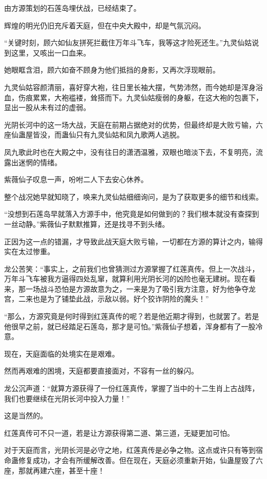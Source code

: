 
\begin{this_body}

由方源策划的石莲岛埋伏战，已经结束了。

辉煌的明光仍旧充斥着天庭，但在中央大殿中，却是气氛沉闷。

“关键时刻，顾六如仙友拼死拦截住万年斗飞车，我等这才险死还生。”九灵仙姑说到这里，又咳出一口血来。

她眼眶含泪，顾六如奋不顾身为他们抵挡的身影，又再次浮现眼前。

九灵仙姑容颜清丽，喜好穿大袍，往日里长袖大摆，气势沛然，而今她却是浑身浴血，伤痕累累，大袍褴褛，耸搭而下。九灵仙姑瘦弱的身躯，在这大袍的包裹下，显出一股从未有过的虚弱。

光阴长河中的这一场大战，天庭在前期占据绝对的优势，但最终却是大败亏输，六座仙蛊屋皆没，而蛊仙只有九灵仙姑和凤九歌两人逃脱。

凤九歌此时也在大殿之中，没有往日的潇洒温雅，双眼也暗淡下去，不复明亮，流露出迷惘的情绪。

紫薇仙子叹息一声，吩咐二人下去安心休养。

整个战况她早就知晓了，唤来九灵仙姑细细询问，是为了获取更多的细节和线索。

“没想到石莲岛早就落入方源手中，他究竟是如何做到的？我们根本就没有查探到一丝动静。”紫薇仙子默默推算，还是找寻不到头绪。

正因为这一点的错漏，才导致此战天庭大败亏输，一切都在方源的算计之内，输得实在太过惨重。

龙公苦笑：“事实上，之前我们也曾猜测过方源掌握了红莲真传。但上一次战斗，万年斗飞车被我方逼得四处乱窜，就算利用光阴长河的凶险也毫无建树。现在看来，那一场战斗恐怕是方源故意为之，一来是为了吸引我方注意，好为他争夺龙宫，二来也是为了铺垫此战，示敌以弱。好个狡诈阴险的魔头！”

“那么，方源究竟是何时得到红莲真传的呢？若是他近期才得到，也就罢了。若是他很早之前，就已经踏足石莲岛，那才是可怕。”紫薇仙子想着，浑身都有了一股冷意。

现在，天庭面临的处境实在是艰难。

然而再艰难的困境，天庭都要直接面对，不容有一丝的躲闪。

龙公沉声道：“就算方源获得了一份红莲真传，掌握了当中的十二生肖上古战阵，我们也要继续在光阴长河中投入力量！”

这是当然的。

红莲真传可不只一道，若是让方源获得第二道、第三道，无疑更加可怕。

对于天庭而言，光阴长河是必守之地，红莲真传是必争之物。这点或许只有等到宿命蛊修复成功，才会有所缓解改善。但在现在，天庭必须重新开始，仙蛊屋毁了六座，那就再建六座，甚至十座！


\end{this_body}
